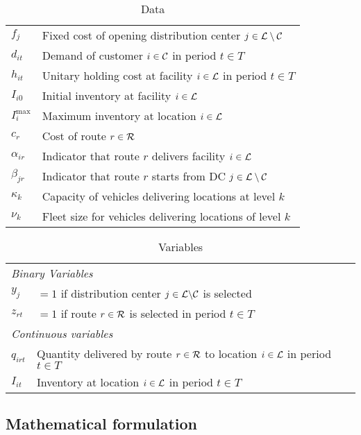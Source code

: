 \documentclass[a4paper,10pt]{article}
\begin{document}
\begin{linenumbers}
\begin{table}[htbp]
	\centering
	\begin{tabular}{ll}
		\toprule
		$f_j$ & Fixed cost of opening distribution center $j\in\mathcal{L} \setminus \mathcal{C}$\\ 
		$d_{it}$ & Demand of customer $i\in\mathcal{C}$ in period $t \in T$\\
		$h_{it}$ & Unitary holding cost at facility $i\in\mathcal{L}$ in period $t \in T$\\
		$I_{i0}$ & Initial inventory at facility $i\in \mathcal{L}$\\
		$I_i^{\max}$ & Maximum inventory at location $i\in\mathcal{L}$\\
		$c_r$ & Cost of route $r\in \mathcal{R}$\\
		$\alpha_{ir}$ & Indicator that route $r$ delivers facility $i \in \mathcal{L}$\\
		$\beta_{jr}$ & Indicator that route $r$ starts from DC $j \in \mathcal{L} \setminus \mathcal{C}$\\
		$\kappa_k$ & Capacity of vehicles delivering locations at level $k$\\ 
		$\nu_k$ & Fleet size for vehicles delivering locations of level $k$\\ 
		\bottomrule
	\end{tabular}
	\caption{Data}
	\label{tab:data}
\end{table}       


	\begin{table}[htbp]
	\centering
	\begin{tabular}{ll}
		\toprule
		\multicolumn{2}{l}{\textit{Binary Variables}}\\
		$y_{j}$ & $=1$ if distribution center $j \in \mathcal{L} \backslash \mathcal{C}$ is selected \\
		$z_{rt}$ & $=1$ if route $r \in \mathcal{R}$  is selected in period $t \in T$\\
		\midrule
		\multicolumn{2}{l}{\textit{Continuous variables}}\\
		$q_{irt}$ & Quantity delivered by route $r \in \mathcal{R}$ to location $i\in \mathcal{L}$ in period $t\in T$\\
		$I_{it}$ &  Inventory at location $i \in \mathcal{L}$ in period $t \in T$\\
		\bottomrule
	\end{tabular}
	\caption{Variables}
	\label{tab:var}
\end{table}    


\subsection{Mathematical  formulation}\label{subsection:MIP}


\end{linenumbers}
\end{document}
